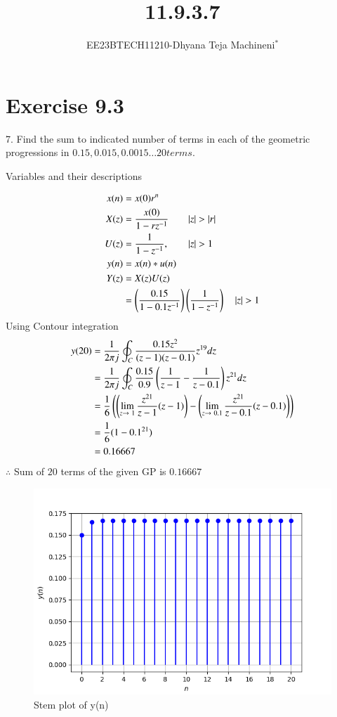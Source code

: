 \documentclass[journal,12pt,twocolumn]{IEEEtran}
\theoremstyle{remark}
\begin{document}

\vspace{3cm}
\title{\textbf{11.9.3.7}}
\author{EE23BTECH11210-Dhyana Teja Machineni$^{*}$%
}
\maketitle
\newpage
\bigskip

\section*{Exercise 9.3}
7. \hspace{2pt}Find the sum to indicated number of terms in each of the geometric progressions in
$0.15, 0.015, 0.0015\ldots 20 terms$.

\solution
     \begin{table}[h]
         \label{tab:table2}
         
         \caption{Variables and their descriptions}
     \end{table}
\begin{align}
x(n) &= x(0)r^n \\
X(z) &= \frac{x(0)}{1-rz^{-1}} \qquad |z| > |r| \\
U(z)&=\frac{1}{1-z^{-1}}, \qquad |z|>1\\
y(n)&= x(n)*u(n)\\
Y(z)&=X(z)U(z)\\
&=\brak{ \frac{0.15}{1-0.1z^{-1}}}\brak{\frac{1}{1-z^{-1}}}\quad|z| > 1
\end{align}
Using Contour integration
\begin{align}
y(20)&=\frac{1}{2\pi j}\oint_C \frac{0.15 z^2}{(z-1)(z-0.1)}z^{19} dz\\
&=\frac{1}{2 \pi j}\oint_C \frac{0.15}{0.9} \left(\frac{1}{z-1} - \frac{1}{z-0.1}\right)z^{21}dz\\
&= \frac{1}{6} \left(\left(\lim_{z\to \ 1}\frac{z^{21}}{z-1} (z-1)\right)-\left(\lim_{z \to \ 0.1}\frac{z^{21}}{z-0.1} (z-0.1)\right)\right)\\
&= \frac{1}{6}(1- 0.1^{21})\\
    &=0.16667
\end{align}
        $\therefore$ Sum of $20$ terms of the given GP is $0.16667$
       \renewcommand{\thefigure}{\theenumi}
 \renewcommand{\thetable}{\theenumi}
\begin{figure}[h]
  
  \includegraphics[width=\columnwidth]{figs/graph.png}
  \caption{Stem plot of y(n)}
  \label{fig:your_label}
\end{figure}
\end{document}
